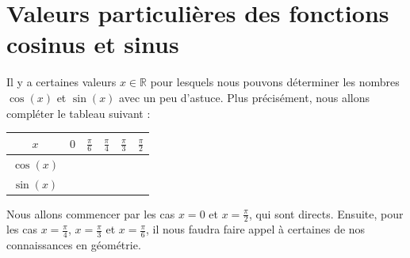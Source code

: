 \documentclass[a4paper,fontsize=13pt]{scrreprt}
\theoremstyle{plain}
\theoremstyle{definition}
\newcommand{\rr}{\mathbb{R}}
\begin{document}
\section{Valeurs particulières des fonctions cosinus et sinus} \label{sectionvp}
Il y a certaines valeurs $x \in \rr$ pour lesquels nous pouvons déterminer les nombres $\cos(x)$ et $\sin(x)$ avec un peu d'astuce. Plus précisément, nous allons compléter le tableau suivant :
\begin{center}
\begin{tabular}{|c|c|c|c|c|c|}
  \hline
  $x$ & $0$ & $\frac{\pi}{6}$ & $\frac{\pi}{4}$ & $\frac{\pi}{3}$ & $\frac{\pi}{2}$\\
  \hline
  $\cos(x)$ & ~ & ~ & ~ & ~ & ~ \\
  \hline
  $\sin(x)$ & ~ & ~ & ~ & ~ & ~ \\
  \hline
\end{tabular}
\end{center}
Nous allons commencer par les cas $x=0$ et $x=\frac{\pi}{2}$, qui sont directs. Ensuite, pour les cas $x=\frac{\pi}{4}$, $x=\frac{\pi}{3}$ et $x=\frac{\pi}{6}$, il nous faudra faire appel à certaines de nos connaissances en géométrie.\\
\end{document}
